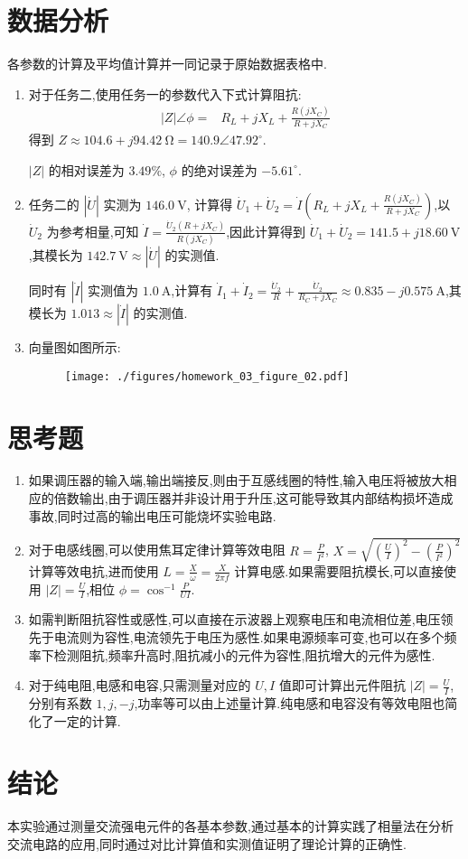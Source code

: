     \section{数据分析}
    各参数的计算及平均值计算并一同记录于原始数据表格中.
    \begin{enumerate}
        \item 对于任务二,使用任务一的参数代入下式计算阻抗:
            \begin{align}
                |Z|\angle\phi=&R_{L}+jX_{L}+\frac{R\left( jX_{C} \right) }{R+jX_{C}}\nonumber
            \end{align}
            得到 $Z\approx 104.6+ j 94.42 \ \mathrm{\Omega}=140.9\angle 47.92^{\circ}$.

            $|Z|$ 的相对误差为 $3.49\%$, $\phi$ 的绝对误差为 $-5.61^{\circ}$.
        \item 任务二的 $|\dot{U}|$ 实测为 $146.0 \ \mathrm{V}$, 计算得 $\dot{U}_{1}+\dot{U}_{2}=\dot{I}\left( R_{L}+jX_{L}+\frac{R\left( jX_{C} \right) }{R+jX_{C}} \right)$,以 $\dot{U}_{2}$ 为参考相量,可知 $\dot{I}=\frac{\dot{U}_2\left( R+jX_{C} \right) }{R\left( jX_{C} \right) }$,因此计算得到 $\dot{U}_{1}+\dot{U}_{2}=141.5+j18.60 \ \mathrm{V}$,其模长为 $142.7 \ \mathrm{V}\approx |\dot{U}|$ 的实测值.

            同时有 $|\dot{I}|$ 实测值为 $1.0 \ \mathrm{A}$,计算有 $\dot{I}_{1}+\dot{I}_{2}=\frac{\dot{U}_{2}}{R}+\frac{\dot{U}_{2}}{R_{C}+jX_{C}}\approx 0.835-j0.575 \ \mathrm{A}$,其模长为 $1.013\approx |\dot{I}|$ 的实测值.
        \item 向量图如图所示:
            \begin{figure}[htbp]
                \centering
                \texttt{[image: ./figures/homework\_03\_figure\_02.pdf]}
            \end{figure}
    \end{enumerate}
    \section{思考题}
    \begin{enumerate}
        \item 如果调压器的输入端,输出端接反,则由于互感线圈的特性,输入电压将被放大相应的倍数输出,由于调压器并非设计用于升压,这可能导致其内部结构损坏造成事故,同时过高的输出电压可能烧坏实验电路.
        \item 对于电感线圈,可以使用焦耳定律计算等效电阻 $R=\frac{P}{I^2}$, $X=\sqrt{\left( \frac{U}{I} \right) ^2-\left( \frac{P}{I^2} \right) ^2}$ 计算等效电抗,进而使用 $L=\frac{X}{\omega}=\frac{X}{2\pi f}$ 计算电感.如果需要阻抗模长,可以直接使用 $|Z|=\frac{U}{I}$,相位 $\phi=\cos^{-1}\frac{P}{UI}$.
        \item 如需判断阻抗容性或感性,可以直接在示波器上观察电压和电流相位差,电压领先于电流则为容性,电流领先于电压为感性.如果电源频率可变,也可以在多个频率下检测阻抗,频率升高时,阻抗减小的元件为容性,阻抗增大的元件为感性.
        \item 对于纯电阻,电感和电容,只需测量对应的 $U,I$ 值即可计算出元件阻抗 $|Z|=\frac{U}{I}$,分别有系数 $1,j,-j$,功率等可以由上述量计算.纯电感和电容没有等效电阻也简化了一定的计算.
    \end{enumerate}
    \section{结论}
    本实验通过测量交流强电元件的各基本参数,通过基本的计算实践了相量法在分析交流电路的应用,同时通过对比计算值和实测值证明了理论计算的正确性.


